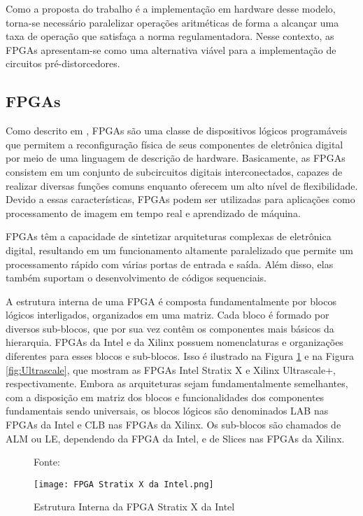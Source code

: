 Como a proposta do trabalho é a implementação em hardware desse modelo, torna-se necessário paralelizar operações aritméticas de forma a alcançar uma taxa de operação que satisfaça a norma regulamentadora. Nesse contexto, as FPGAs apresentam-se como uma alternativa viável para a implementação de circuitos pré-distorcedores.

\subsection{FPGAs}

Como descrito em \cite{Pedroni2010}, FPGAs são uma classe de dispositivos lógicos programáveis que permitem a reconfiguração física de seus componentes de eletrônica digital por meio de uma linguagem de descrição de hardware. Basicamente, as FPGAs consistem em um conjunto de subcircuitos digitais interconectados, capazes de realizar diversas funções comuns enquanto oferecem um alto nível de flexibilidade. Devido a essas características, FPGAs podem ser utilizadas para aplicações como processamento de imagem em tempo real e aprendizado de máquina.

FPGAs têm a capacidade de sintetizar arquiteturas complexas de eletrônica digital, resultando em um funcionamento altamente paralelizado que permite um processamento rápido com várias portas de entrada e saída. Além disso, elas também suportam o desenvolvimento de códigos sequenciais.

A estrutura interna de uma FPGA é composta fundamentalmente por blocos lógicos interligados, organizados em uma matriz. Cada bloco é formado por diversos sub-blocos, que por sua vez contêm os componentes mais básicos da hierarquia. FPGAs da Intel e da Xilinx possuem nomenclaturas e organizações diferentes para esses blocos e sub-blocos. Isso é ilustrado na Figura \ref{fig:Stratix} e na Figura \ref{fig:Ultrascale}, que mostram as FPGAs Intel Stratix X e Xilinx Ultrascale+, respectivamente. Embora as arquiteturas sejam fundamentalmente semelhantes, com a disposição em matriz dos blocos e funcionalidades dos componentes fundamentais sendo universais, os blocos lógicos são denominados LAB nas FPGAs da Intel e CLB nas FPGAs da Xilinx. Os sub-blocos são chamados de ALM ou LE, dependendo da FPGA da Intel, e de Slices nas FPGAs da Xilinx.

\begin{figure}[H]
    \centering
    \captionsetup{justification=centering}
    \caption*{Fonte: \cite{Pedroni2010}}
    \texttt{[image: FPGA Stratix X da Intel.png]}
    \caption{Estrutura Interna da FPGA Stratix X da Intel}
    \label{fig:Stratix}
\end{figure}

